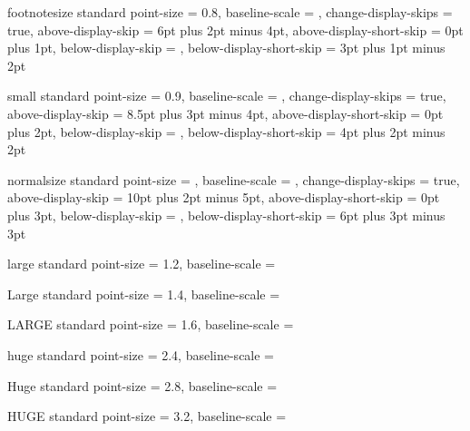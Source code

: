  {footnotesize} {standard}
  {
    point-size               = \ScaleToNearestTenthPoint {\NormalPointSize} {0.8},
    baseline-scale           = \NormalBaselineScale,
    change-display-skips     = true,
    above-display-skip       = 6pt plus 2pt minus 4pt,
    above-display-short-skip = 0pt plus 1pt,
    below-display-skip       = ,
    below-display-short-skip = 3pt plus 1pt minus 2pt
  }

 {small} {standard}
  {
    point-size               = \ScaleToNearestTenthPoint {\NormalPointSize} {0.9},
    baseline-scale           = \NormalBaselineScale,
    change-display-skips     = true,
    above-display-skip       = 8.5pt plus 3pt minus 4pt,
    above-display-short-skip = 0pt plus 2pt,
    below-display-skip       = ,
    below-display-short-skip = 4pt plus 2pt minus 2pt
  }

 {normalsize} {standard}
  {
    point-size               = \NormalPointSize,
    baseline-scale           = \NormalBaselineScale,
    change-display-skips     = true,
    above-display-skip       = 10pt plus 2pt minus 5pt,
    above-display-short-skip = 0pt plus 3pt,
    below-display-skip       = ,
    below-display-short-skip = 6pt plus 3pt minus 3pt
  }

 {large} {standard}
  {
    point-size     = \ScaleToNearestTenthPoint {\NormalPointSize} {1.2},
    baseline-scale = \NormalBaselineScale
  }

 {Large} {standard}
  {
    point-size     = \ScaleToNearestTenthPoint {\NormalPointSize} {1.4},
    baseline-scale = \NormalBaselineScale
  }

 {LARGE} {standard}
  {
    point-size     = \ScaleToNearestTenthPoint {\NormalPointSize} {1.6},
    baseline-scale = \NormalBaselineScale
  }

 {huge} {standard}
  {
    point-size     = \ScaleToNearestTenthPoint {\NormalPointSize} {2.4},
    baseline-scale = \NormalBaselineScale
  }

 {Huge} {standard}
  {
    point-size     = \ScaleToNearestTenthPoint {\NormalPointSize} {2.8},
    baseline-scale = \NormalBaselineScale
  }

 {HUGE} {standard}
  {
    point-size     = \ScaleToNearestTenthPoint {\NormalPointSize} {3.2},
    baseline-scale = \NormalBaselineScale
  }




